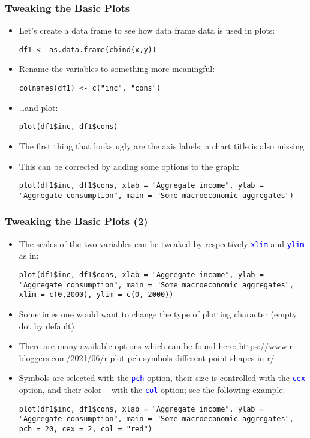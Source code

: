 \documentclass[10pt]{beamer}
\newcommand{\cc}[1]{\texttt{\textcolor{blue}{#1}}}
\theoremstyle{definition}
\begin{document}
\begin{frame}[fragile]
\frametitle{Tweaking the Basic Plots}
\begin{itemize}
	\item Let's create a data frame to see how data frame data is used in plots:
	\begin{lstlisting}[style = rstyle, breaklines]
	df1 <- as.data.frame(cbind(x,y))
	\end{lstlisting}
	\item Rename the variables to something more meaningful:
	\begin{lstlisting}[style = rstyle, breaklines]
	colnames(df1) <- c("inc", "cons")
	\end{lstlisting}
	\item \ldots and plot:
	\begin{lstlisting}[style = rstyle, breaklines]
	plot(df1$inc, df1$cons)
	\end{lstlisting}
	\item The first thing that looks ugly are the axis labels; a chart title is also missing
	\item This can be corrected by adding some options to the graph:
	\begin{lstlisting}[style = rstyle, breaklines]
	plot(df1$inc, df1$cons, xlab = "Aggregate income", ylab = "Aggregate consumption", main = "Some macroeconomic aggregates")
	\end{lstlisting}
\end{itemize}
\end{frame}

\begin{frame}[fragile]
\frametitle{Tweaking the Basic Plots (2)}
\begin{itemize}
	\item The scales of the two variables can be tweaked by respectively \cc{xlim} and \cc{ylim} as in:
	\begin{lstlisting}[style = rstyle, breaklines]
	plot(df1$inc, df1$cons, xlab = "Aggregate income", ylab = "Aggregate consumption", main = "Some macroeconomic aggregates", xlim = c(0,2000), ylim = c(0, 2000))
	\end{lstlisting}
	\item Sometimes one would want to change the type of plotting character (empty dot by default)
	\item There are many available options which can be found here: \url{https://www.r-bloggers.com/2021/06/r-plot-pch-symbols-different-point-shapes-in-r/}
	\item Symbols are selected with the \cc{pch} option, their size is controlled with the \cc{cex} option, and their color -- with the \cc{col} option; see the following example:
	\begin{lstlisting}[style = rstyle, breaklines]
	plot(df1$inc, df1$cons, xlab = "Aggregate income", ylab = "Aggregate consumption", main = "Some macroeconomic aggregates", pch = 20, cex = 2, col = "red")
	\end{lstlisting}
\end{itemize}
\end{frame}
\end{document}
